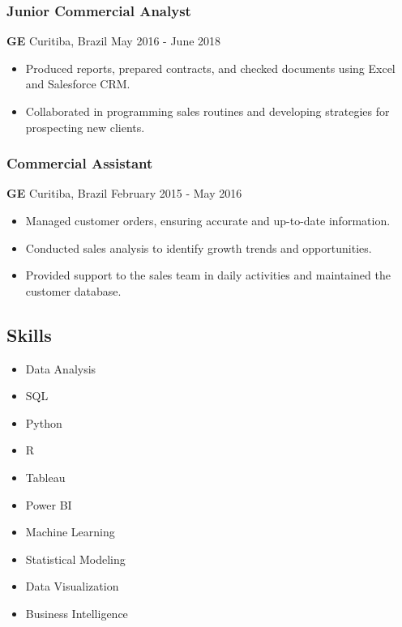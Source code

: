 \documentclass[
]{article}
\providecommand{\tightlist}{%
  \setlength{\itemsep}{0pt}\setlength{\parskip}{0pt}}
\begin{document}
\subsubsection{Junior Commercial
Analyst}\label{junior-commercial-analyst}

\textbf{GE} \textbar{} Curitiba, Brazil \textbar{} May 2016 - June 2018

\begin{itemize}
\tightlist
\item
  Produced reports, prepared contracts, and checked documents using
  Excel and Salesforce CRM.
\item
  Collaborated in programming sales routines and developing strategies
  for prospecting new clients.
\end{itemize}

\subsubsection{Commercial Assistant}\label{commercial-assistant}

\textbf{GE} \textbar{} Curitiba, Brazil \textbar{} February 2015 - May
2016

\begin{itemize}
\tightlist
\item
  Managed customer orders, ensuring accurate and up-to-date information.
\item
  Conducted sales analysis to identify growth trends and opportunities.
\item
  Provided support to the sales team in daily activities and maintained
  the customer database.
\end{itemize}

\subsection{Skills}\label{skills}

\begin{itemize}
\tightlist
\item
  Data Analysis
\item
  SQL
\item
  Python
\item
  R
\item
  Tableau
\item
  Power BI
\item
  Machine Learning
\item
  Statistical Modeling
\item
  Data Visualization
\item
  Business Intelligence
\end{itemize}
\end{document}
